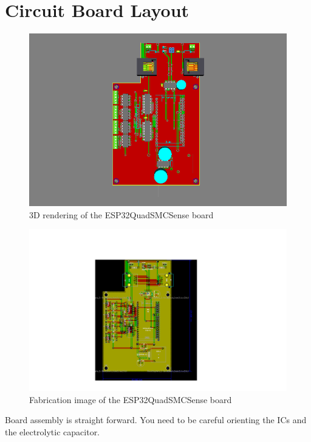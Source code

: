 \section{Circuit Board Layout}

\begin{figure}[hbpt]\begin{centering}%
\includegraphics[width=5in]{ESP32QuadSMCSense3DTop.png}
\caption{3D rendering of the ESP32QuadSMCSense board}
\end{centering}\end{figure}
\begin{figure}[hbpt]\begin{centering}%
\includegraphics[width=5in]{ESP32QuadSMCSense.png}
\caption{Fabrication image of the ESP32QuadSMCSense board}
\end{centering}\end{figure}
Board assembly is straight forward. You need to be careful orienting the ICs
and the electrolytic capacitor.

